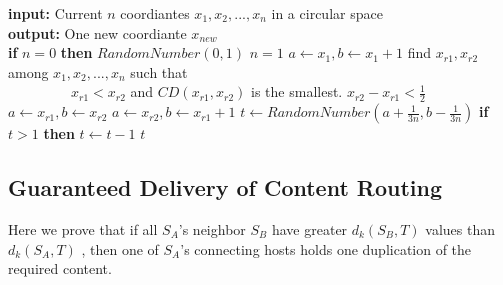 \documentclass[10pt,conference]{IEEEtran}
\begin{document}
\begin{appendix}
\fi
\iffalse
\begin{codebox}
\Procname{$\proc{\textbf{Algorithm 5.} Balanced random coordinate generation}$}
\textbf{input:} Current number of switches $n$, a new ToR switch $s$ \\
\textbf{output:} Coordinates of $s$: $x_{s,1}, x_{s,2}, ..., x_{s, L}$\\
\li \If $s$ is the first switch in the network
\li \Then \Return random coordinates $x_{s,1}, x_{s,2}, ..., x_{s, L}$; \End
\li \If $s$ is the second switch in the network
\li \Then  \Return $x_{s,1}+0.5, x_{s,2}+0.5, ..., x_{s, L}+0.5$; \End
\li \For $1\leq k \leq L$
\li \Do Let $u$ and $v$ be two adjacent switches in space $k$ with\\ maximum circular distance, such that  $\wideparen{u, v}$ is shorter than $\wideparen{v, u}$.
\li Remove the link of $u$ and $v$;
\li Connect $s$ and $u$, and $s$ and $v$;
\li $\delta \gets \frac{1}{3n}$;
\li \If $x_u< x_v$
\li \Then $x_{s,k} \gets Random(x_u+\delta, x_v-\delta) $;
\li \Else $x_{s,k} \gets Random(x_u+\delta, x_v+1-\delta) $; \End \End
\li \Return $x_{s,1}, x_{s,2}, ..., x_{s, L}$;
\end{codebox}
\fi


\begin{codebox}
\textbf{input:} Current $n$ coordiantes $x_1, x_2, ..., x_n$ in a circular space  \\
\textbf{output:} One new coordiante $x_{new}$ \\
\li \textbf{if} $n=0$   \textbf{then} \Return $RandomNumber(0,1)$
\li \If $n=1$
\li \Then $a \gets x_1, b \gets x_1+1$ \End  \li \Else find $x_{r1},x_{r2}$ among $x_1,x_2, ..., x_n$ such that \\
\ \ \ \ \ \ \ \ \  $x_{r1}<x_{r2}$ and $CD(x_{r1},x_{r2})$ is the smallest.
\li \If $x_{r2}-x_{r1} < \frac{1}{2} $
\li \Then $a \gets x_{r1}, b \gets x_{r2} $ \End
\li \Else $a \gets x_{r2}, b \gets x_{r1}+1 $\End \End
\li $t \gets RandomNumber(a+\frac{1}{3n},b-\frac{1}{3n})$
\li \textbf{if} $t>1$ \textbf{then} $t \gets t - 1 $
\li \Return $t$
\end{codebox}

\iffalse
\subsection{Guaranteed Delivery of Content Routing }
Here we prove that if all $S_A$'s neighbor $S_B$ have greater $d_k(S_B,T)$ values than $d_k(S_A,T)$ ,
then one of $S_A$'s connecting hosts holds one duplication of the required content.


\end{appendix}
\end{document}
